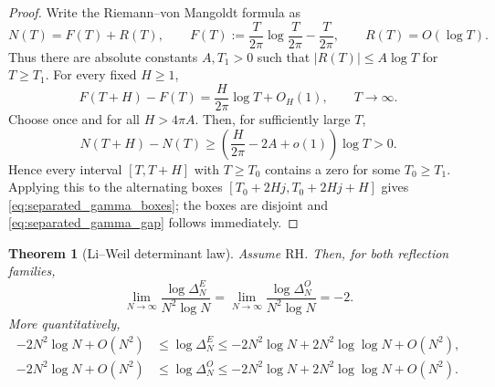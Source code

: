 \documentclass[preprint,12pt]{elsarticle}
\numberwithin{equation}{section}
\theoremstyle{plain}
\newtheorem{theorem}{Theorem}[section]
\theoremstyle{definition}
\theoremstyle{remark}
\newcommand{\RH}{\mathrm{RH}}
\begin{document}
\begin{proof}
Write the Riemann--von Mangoldt formula as
\begin{equation}
N(T)=F(T)+R(T),
\qquad
F(T):=\frac{T}{2\pi}\log\frac{T}{2\pi}-\frac{T}{2\pi},
\qquad
R(T)=O(\log T).
\label{eq:RVM_for_boxes}
\end{equation}
Thus there are absolute constants $A,T_1>0$ such that $|R(T)|\le A\log T$ for $T\ge T_1$. For every fixed $H\ge1$,
\begin{equation}
F(T+H)-F(T)=\frac{H}{2\pi}\log T+O_H(1),
\qquad T\to\infty.
\label{eq:RVM_short_fixed_interval}
\end{equation}
Choose once and for all $H>4\pi A$. Then, for sufficiently large $T$,
\[
N(T+H)-N(T)
\ge
\left(\frac{H}{2\pi}-2A+o(1)\right)\log T>0.
\]
Hence every interval $[T,T+H]$ with $T\ge T_0$ contains a zero for some $T_0\ge T_1$. Applying this to the alternating boxes $[T_0+2Hj,T_0+2Hj+H]$ gives \eqref{eq:separated_gamma_boxes}; the boxes are disjoint and \eqref{eq:separated_gamma_gap} follows immediately.
\end{proof}

\begin{theorem}[Li--Weil determinant law]
\label{thm:determinant_first_order}
Assume $\RH$. Then, for both reflection families,
\begin{equation}
\boxed{
\lim_{N\to\infty}
\frac{\log\Delta_N^E}{N^2\log N}
=
\lim_{N\to\infty}
\frac{\log\Delta_N^O}{N^2\log N}
=-2.}
\label{eq:determinant_first_order_limit}
\end{equation}
More quantitatively,
\begin{align}
-2N^2\log N+O(N^2)
&\le \log\Delta_N^E
\le -2N^2\log N+2N^2\log\log N+O(N^2),
\label{eq:E_determinant_two_sided}\\
-2N^2\log N+O(N^2)
&\le \log\Delta_N^O
\le -2N^2\log N+2N^2\log\log N+O(N^2).
\label{eq:O_determinant_two_sided}
\end{align}
\end{theorem}
\end{document}
